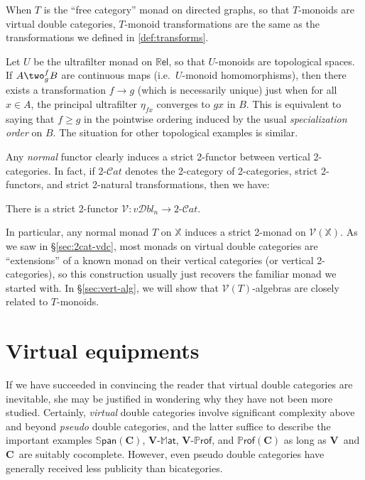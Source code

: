 \documentclass{tac}
\makeatletter
\newcommand{\V}{\ensuremath{\mathbf{V}}}
\newcommand{\C}{\ensuremath{\mathbf{C}}}
\newcommand{\calV}{\ensuremath{\mathcal{V}}}
\newcommand{\mb}[1]{{\mathbf{#1}}}
\newcommand{\maps}{\colon}
\newcommand{\MAT}[1]{\mathbf{#1}\mbox{-}\mathbb{M}\mathsf{at}}
\newcommand{\PROF}[1]{\mathbf{#1}\mbox{-}\mathbb{P}\mathsf{rof}}
\newcommand{\SPAN}[1]{\mathbb{S}\mathsf{pan}\!\left(\mb{#1}\right)}
\newcommand{\iPROF}[1]{\mathbb{P}\mathsf{rof}(\mb{#1})}
\newcommand{\Rel}{\mathbb{R}\mathsf{el}}
\newcommand{\twoCat}{2\mbox{-}\mathcal{C}\mathit{at}}
\newcommand{\vDbln}{\ensuremath{\mathit{v}\mathcal{D}\mathit{bl}_{n}}}
\numberwithin{equation}{section}
\def\currthmtype{}
\let\old@label\label
\def\label#1{%
    {\let\your@currentlabel\@currentlabel%
      \edef\@currentlabel{\currthmtype}%
      \old@label{label@name@#1}}%
    \old@label{#1}}
\makeatother
\begin{document}
\begin{example}
  When $T$ is the ``free category'' monad on directed graphs, so that
  $T$-monoids are virtual double categories, $T$-monoid
  transformations are the same as the transformations we defined in
  \ref{def:transforms}.
\end{example}

\begin{example}
  Let $U$ be the ultrafilter monad on $\Rel$, so that $U$-monoids are
  topological spaces.  If $A\two^f_g B$ are continuous maps (i.e.\
  $U$-monoid homomorphisms), then there exists a transformation $f\to
  g$ (which is necessarily unique) just when for all $x\in A$, the
  principal ultrafilter $\eta_{fx}$ converges to $gx$ in $B$.  This is
  equivalent to saying that $f\ge g$ in the pointwise ordering induced
  by the usual \emph{specialization order} on $B$.  The situation for
  other topological examples is similar.
\end{example}

Any \emph{normal} functor clearly induces a strict 2-functor between
vertical 2-categories.  In fact, if $\twoCat$ denotes the 2-category of
2-categories, strict 2-functors, and strict 2-natural transformations,
then we have:

\begin{proposition}
  There is a strict 2-functor $\calV\maps \vDbln \to \twoCat$.
\end{proposition}

In particular, any normal monad $T$ on $\mathbb{X}$ induces a strict 2-monad on
$\calV(\mathbb{X})$.  As we saw in \S\ref{sec:2cat-vdc}, most monads
on virtual double categories are ``extensions'' of a known monad on
their vertical categories (or vertical 2-categories), so this
construction usually just recovers the familiar monad we started with.
In \S\ref{sec:vert-alg}, we will show that $\calV(T)$-algebras are
closely related to $T$-monoids.


\section{Virtual equipments}
\label{sec:pfrbi}

If we have succeeded in convincing the reader that virtual double
categories are inevitable, she may be justified in wondering why they
have not been more studied.  Certainly, \emph{virtual} double
categories involve significant complexity above and beyond
\emph{pseudo} double categories, and the latter suffice to describe
the important examples $\SPAN{C}$, $\MAT{V}$, $\PROF{V}$, and
$\iPROF{C}$ as long as \V\ and \C\ are suitably cocomplete.  However,
even pseudo double categories have generally received less
publicity than bicategories.
\end{document}
